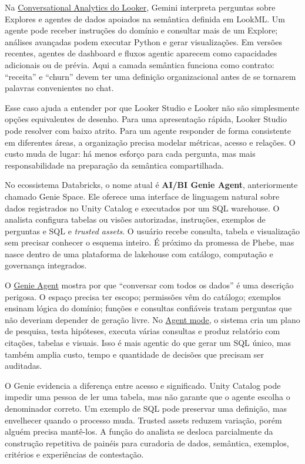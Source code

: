 Na \href{https://docs.cloud.google.com/looker/docs/conversational-analytics-overview}{Conversational Analytics do Looker}, Gemini interpreta perguntas sobre Explores e agentes de dados apoiados na semântica definida em LookML. Um agente pode receber instruções do domínio e consultar mais de um Explore; análises avançadas podem executar Python e gerar visualizações. Em versões recentes, agentes de dashboard e fluxos agentic aparecem como capacidades adicionais ou de prévia. Aqui a camada semântica funciona como contrato: ``receita'' e ``churn'' devem ter uma definição organizacional antes de se tornarem palavras convenientes no chat.

Esse caso ajuda a entender por que Looker Studio e Looker não são simplesmente opções equivalentes de desenho. Para uma apresentação rápida, Looker Studio pode resolver com baixo atrito. Para um agente responder de forma consistente em diferentes áreas, a organização precisa modelar métricas, acesso e relações. O custo muda de lugar: há menos esforço para cada pergunta, mas mais responsabilidade na preparação da semântica compartilhada.

No ecossistema Databricks, o nome atual é \textbf{AI/BI Genie Agent}, anteriormente chamado Genie Space. Ele oferece uma interface de linguagem natural sobre dados registrados no Unity Catalog e executados por um SQL warehouse. O analista configura tabelas ou visões autorizadas, instruções, exemplos de perguntas e SQL e \textit{trusted assets}. O usuário recebe consulta, tabela e visualização sem precisar conhecer o esquema inteiro. É próximo da promessa de Phebe, mas nasce dentro de uma plataforma de lakehouse com catálogo, computação e governança integrados.

O \href{https://docs.databricks.com/aws/en/genie/set-up}{Genie Agent} mostra por que ``conversar com todos os dados'' é uma descrição perigosa. O espaço precisa ter escopo; permissões vêm do catálogo; exemplos ensinam lógica do domínio; funções e consultas confiáveis tratam perguntas que não deveriam depender de geração livre. No \href{https://docs.databricks.com/aws/en/genie/agent-mode}{Agent mode}, o sistema cria um plano de pesquisa, testa hipóteses, executa várias consultas e produz relatório com citações, tabelas e visuais. Isso é mais agentic do que gerar um SQL único, mas também amplia custo, tempo e quantidade de decisões que precisam ser auditadas.

O Genie evidencia a diferença entre acesso e significado. Unity Catalog pode impedir uma pessoa de ler uma tabela, mas não garante que o agente escolha o denominador correto. Um exemplo de SQL pode preservar uma definição, mas envelhecer quando o processo muda. Trusted assets reduzem variação, porém alguém precisa mantê-los. A função do analista se desloca parcialmente da construção repetitiva de painéis para curadoria de dados, semântica, exemplos, critérios e experiências de contestação.

